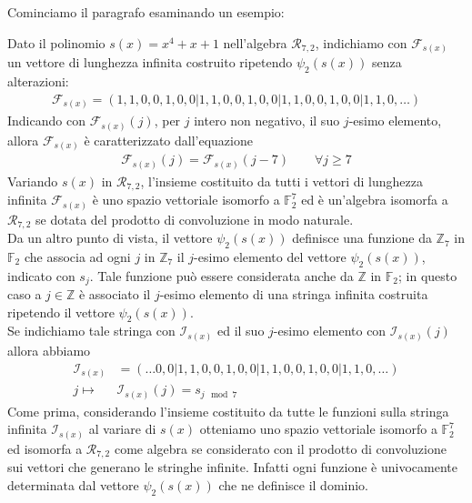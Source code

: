 Cominciamo il paragrafo esaminando un esempio:
\begin{esempio}\label{ese:ricorr1}
   Dato il polinomio $s(x) = x^4 + x+ 1$ nell'algebra $\mathcal{R}_{7,2}$, indichiamo con $\mathscr{F}_{s(x)}$ un vettore di lunghezza infinita costruito ripetendo $\psi_{2}(s(x))$ senza alterazioni:
   \begin{align*}
      \mathscr{F}_{s(x)} = (1,1,0,0,1,0,0 | 1,1,0,0,1,0,0  | 1,1,0,0,1,0,0 | 1,1,0, \dots )
   \end{align*}
   Indicando con $\mathscr{F}_{s(x)}(j)$, per $j$ intero non negativo, il suo $j$-esimo elemento, allora $\mathscr{F}_{s(x)}$ è caratterizzato dall'equazione
   \begin{align*}
      \mathscr{F}_{s(x)} (j) = \mathscr{F}_{s(x)} (j-7) \qquad \forall j \geq 7 
   \end{align*}
   Variando $s(x)$ in $\mathcal{R}_{7,2}$, l'insieme costituito da tutti i vettori di lunghezza infinita $\mathscr{F}_{s(x)}$ è uno spazio vettoriale isomorfo a $\mathbb{F}_{2}^{7}$ ed è un'algebra isomorfa a $\mathcal{R}_{7,2}$ se dotata del prodotto di convoluzione in modo naturale.\\
   Da un altro punto di vista, il vettore $\psi_{2}(s(x))$ definisce una funzione da $\mathbb{Z}_{7}$ in $\mathbb{F}_{2}$ che associa ad ogni $j$ in $\mathbb{Z}_{7}$ il $j$-esimo elemento del vettore $\psi_{2}(s(x))$, indicato con $s_j$. Tale funzione può essere considerata anche da $\mathbb{Z}$ in $\mathbb{F}_{2}$; in questo caso a $j \in \mathbb{Z}$ è associato il $j$-esimo elemento di una stringa infinita costruita ripetendo il vettore $\psi_{2}(s(x))$.\\
   Se indichiamo tale stringa con $\mathscr{I}_{s(x)}$ ed il suo $j$-esimo elemento con $\mathscr{I}_{s(x)}(j)$ allora abbiamo
   \begin{align*}
      \mathscr{I}_{s(x)} &= ( \dots 0,0 | 1,1,0,0,1,0,0  | 1,1,0,0,1,0,0 | 1,1,0, \dots ) \\
      j \longmapsto & \mathscr{I}_{s(x)}(j) = s_{j \mod{7}}
   \end{align*}
   Come prima, considerando l'insieme costituito da tutte le funzioni sulla stringa infinita $\mathscr{I}_{s(x)}$ al variare di $s(x)$ otteniamo uno spazio vettoriale isomorfo a $\mathbb{F}_{2}^{7}$ ed isomorfa a $\mathcal{R}_{7,2}$ come algebra se considerato con il prodotto di convoluzione sui vettori che generano le stringhe infinite. Infatti ogni funzione è univocamente determinata dal vettore $\psi_{2}(s(x))$ che ne definisce il dominio. \\
\end{esempio}
